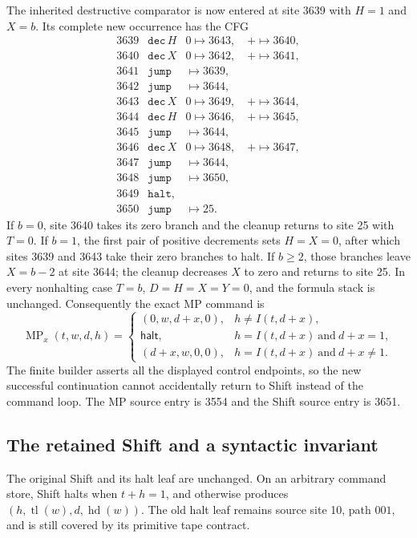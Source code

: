 The inherited destructive comparator is now entered at site 3639 with
$H=1$ and $X=b$. Its complete new occurrence has the CFG
\[
\begin{array}{rll}
3639&\mathtt{dec}\,H&0\mapsto3643,\quad +\mapsto3640,\\
3640&\mathtt{dec}\,X&0\mapsto3642,\quad +\mapsto3641,\\
3641&\mathtt{jump}&\mapsto3639,\\
3642&\mathtt{jump}&\mapsto3644,\\
3643&\mathtt{dec}\,X&0\mapsto3649,\quad +\mapsto3644,\\
3644&\mathtt{dec}\,H&0\mapsto3646,\quad +\mapsto3645,\\
3645&\mathtt{jump}&\mapsto3644,\\
3646&\mathtt{dec}\,X&0\mapsto3648,\quad +\mapsto3647,\\
3647&\mathtt{jump}&\mapsto3644,\\
3648&\mathtt{jump}&\mapsto3650,\\
3649&\mathtt{halt},&\\
3650&\mathtt{jump}&\mapsto25.
\end{array}
\]
If $b=0$, site 3640 takes its zero branch and the cleanup returns to
site 25 with $T=0$. If $b=1$, the first pair of positive decrements
sets $H=X=0$, after which sites 3639 and 3643 take their zero branches
to halt. If $b\ge2$, those branches leave $X=b-2$ at site 3644; the
cleanup decreases $X$ to zero and returns to site 25. In every
nonhalting case $T=b$, $D=H=X=Y=0$, and the formula stack is unchanged.
Consequently the exact MP command is
\[
 \operatorname{MP}_x(t,w,d,h)=
 \begin{cases}
  (0,w,d+x,0),&h\ne I(t,d+x),\\
  \mathsf{halt},&h=I(t,d+x)\ \text{and}\ d+x=1,\\
  (d+x,w,0,0),&h=I(t,d+x)\ \text{and}\ d+x\ne1.
 \end{cases}
\]
The finite builder asserts all the displayed control endpoints, so the
new successful continuation cannot accidentally return to Shift instead
of the command loop. The MP source entry is 3554 and the Shift source
entry is 3651.

\subsection{The retained Shift and a syntactic invariant}

The original Shift and its halt leaf are unchanged. On an arbitrary
command store, Shift halts when $t+h=1$, and otherwise produces
$(h,\operatorname{tl}(w),d,\operatorname{hd}(w))$.
The old halt leaf remains source site 10, path $001$, and is still
covered by its primitive tape contract.


